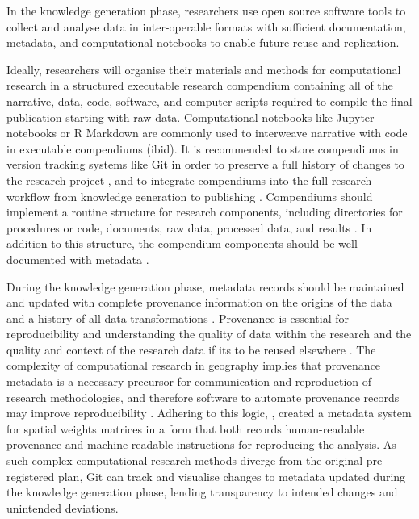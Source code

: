 \documentclass{isprs} %
\begin{document}
In the knowledge generation phase, researchers use open source software tools to collect and analyse data in inter-operable formats with sufficient documentation, metadata, and computational notebooks to enable future reuse and replication.

Ideally, researchers will organise their materials and methods for computational research in a structured executable research compendium \citep{Singleton2016,Nust2021} containing all of the narrative, data, code, software, and computer scripts required to compile the final publication starting with raw data.
Computational notebooks like Jupyter notebooks or R Markdown are commonly used to interweave narrative with code in executable compendiums (ibid).
It is recommended to store compendiums in version tracking systems like Git in order to preserve a full history of changes to the research project \citep{Stodden2014}, and to integrate compendiums into the full research workflow from knowledge generation to publishing \citep{Kray2019}.
Compendiums should implement a routine structure for research components, including directories for procedures or code, documents, raw data, processed data, and results \citep{Kedron_Holler_2022,Christensen2019,Marwick2018}.
In addition to this structure, the compendium components should be well-documented with metadata \citep{Kedron_Holler_2022,Marwick2018}.

During the knowledge generation phase, metadata records should be maintained and updated with complete provenance information on the origins of the data and a history of all data transformations \citep{NASEM2019,Tullis2021}.
Provenance is essential for reproducibility \citep{Kedron2021} and understanding the quality of data within the research and the quality and context of the research data if its to be reused elsewhere \citep{Tullis2021,Schuurman2006}.
The complexity of computational research in geography implies that provenance metadata is a necessary precursor for communication and reproduction of research methodologies, and therefore software to automate provenance records may improve reproducibility \citep{Kedron2021}.
Adhering to this logic, \citet{Anselin2014}, created a metadata system for spatial weights matrices in  a form that both records human-readable provenance and machine-readable instructions for reproducing the analysis.
As such complex computational research methods diverge from the original pre-registered plan, Git can track and visualise changes to metadata updated during the knowledge generation phase, lending transparency to intended changes and unintended deviations.
\end{document}
